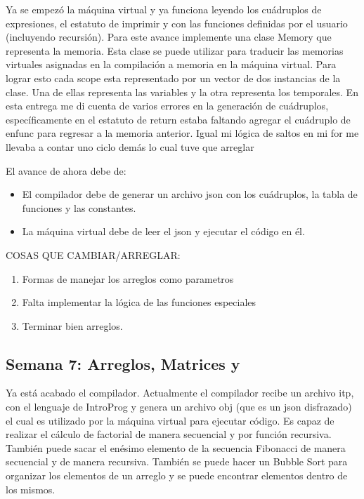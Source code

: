 Ya se empezó la máquina virtual y ya funciona leyendo los cuádruplos de expresiones, el estatuto de imprimir y con las funciones definidas por el usuario (incluyendo recursión). Para este avance implemente una clase Memory que representa la memoria. Esta clase se puede utilizar para traducir las memorias virtuales asignadas en la compilación a memoria en la máquina virtual. Para lograr esto cada scope esta representado por un vector de dos instancias de la clase. Una de ellas representa las variables y la otra representa los temporales. En esta entrega me di cuenta de varios errores en la generación de cuádruplos, específicamente en el estatuto de return estaba faltando agregar el cuádruplo de enfunc para regresar a la memoria anterior. Igual mi lógica de saltos en mi for me llevaba a contar uno ciclo demás lo cual tuve que arreglar


El avance de ahora debe de:

\begin{itemize}
    \item El compilador debe de generar un archivo json con los cuádruplos, la tabla de funciones y las constantes.
    \item La máquina virtual debe de leer el json y ejecutar el código en él.
\end{itemize}

COSAS QUE CAMBIAR/ARREGLAR:

\begin{enumerate}
    \item Formas de manejar los arreglos como parametros
    \item Falta implementar la lógica de las funciones especiales
    \item Terminar bien arreglos.
\end{enumerate}


\subsection{Semana 7: Arreglos, Matrices y }

Ya está acabado el compilador. Actualmente el compilador recibe un archivo itp, con el lenguaje de IntroProg y genera un archivo obj (que es un json disfrazado) el cual es utilizado por la máquina virtual para ejecutar código. Es capaz de realizar el cálculo de factorial de manera secuencial y por función recursiva. También puede sacar el enésimo elemento de la secuencia Fibonacci de manera secuencial y de manera recursiva. También se puede hacer un Bubble Sort para organizar los elementos de un arreglo y se puede encontrar elementos dentro de los mismos.

